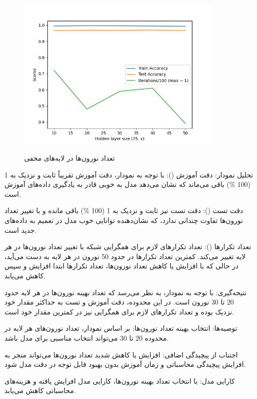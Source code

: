 \documentclass[12pt, dvipsnames, svgnames, x11names,]{article}
\begin{document}
		\begin{figure}
			\begin{center}
				{\includegraphics[width=10cm]{images/02.png}}
			\end{center}
			\caption{تعداد نورون‌ها در لایه‌های مخفی}
			\label{fig:hidden_layer_size}
		\end{figure}
		
		تحلیل نمودار:
		دقت آموزش (): با توجه به نمودار، دقت آموزش تقریباً ثابت و نزدیک به 1 (100 \%) باقی می‌ماند که نشان می‌دهد مدل به خوبی قادر به یادگیری داده‌های آموزش است.
		
		
		دقت تست (): دقت تست نیز ثابت و نزدیک به 1 (100 \%) باقی مانده و با تغییر تعداد نورون‌ها تفاوت چندانی ندارد، که نشان‌دهنده توانایی خوب مدل در تعمیم به داده‌های جدید است.
		
		
		تعداد تکرارها (): تعداد تکرارهای لازم برای همگرایی شبکه با تغییر تعداد نورون‌ها در هر لایه تغییر می‌کند. کمترین تعداد تکرارها در حدود 50 نورون در هر لایه به دست می‌آید، در حالی که با افزایش یا کاهش تعداد نورون‌ها، تعداد تکرارها ابتدا افزایش و سپس کاهش می‌یابد.
		
		
		نتیجه‌گیری:
		با توجه به نمودار، به نظر می‌رسد که تعداد بهینه نورون‌ها در هر لایه حدود 20 تا 30 نورون است. در این محدوده، دقت آموزش و تست به حداکثر مقدار خود نزدیک بوده و تعداد تکرارهای لازم برای همگرایی نیز در کمترین مقدار خود است.
		
		
		توصیه‌ها:
		انتخاب بهینه تعداد نورون‌ها: بر اساس نمودار، تعداد نورون‌های هر لایه در محدوده 20 تا 30 می‌تواند انتخاب مناسبی برای مدل  باشد.
		
		
		اجتناب از پیچیدگی اضافی: افزایش یا کاهش شدید تعداد نورون‌ها می‌تواند منجر به افزایش پیچیدگی محاسباتی و زمان آموزش بدون بهبود قابل توجه در دقت مدل شود.
		
		
		کارایی مدل: با انتخاب تعداد بهینه نورون‌ها، کارایی مدل افزایش یافته و هزینه‌های محاسباتی کاهش می‌یابد.
		
\end{document}
